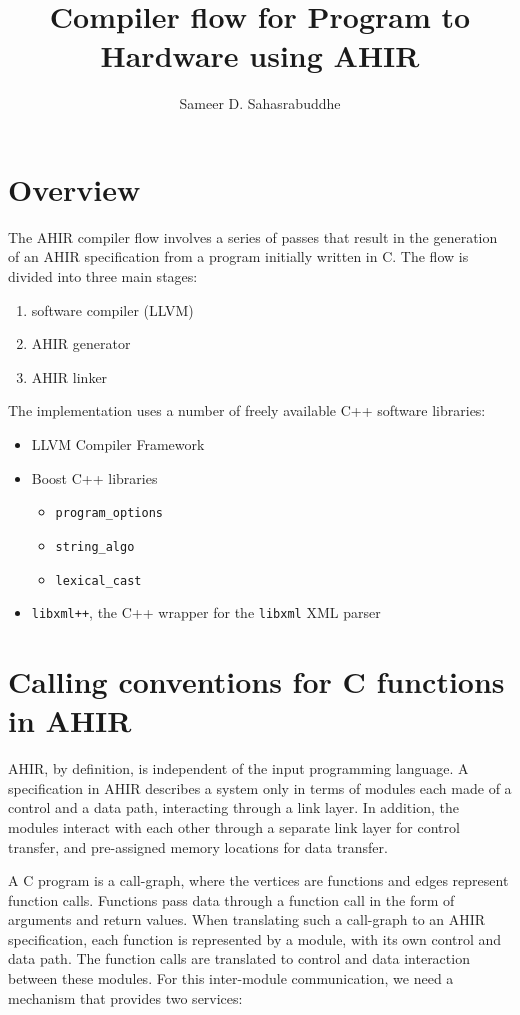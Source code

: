 \documentclass[12pt]{article}
\title{Compiler flow for Program to Hardware using AHIR}
\author{Sameer D. Sahasrabuddhe}
\begin{document}
\maketitle

\section{Overview}

The AHIR compiler flow involves a series of passes that result in the
generation of an AHIR specification from a program initially written
in C. The flow is divided into three main stages:

\begin{enumerate}
\item software compiler (LLVM)
\item AHIR generator
\item AHIR linker
\end{enumerate}

The implementation uses a number of freely available C++ software
libraries:

\begin{itemize}
\item LLVM Compiler Framework
\item Boost C++ libraries
\begin{itemize}
\item {\tt program\_options}
\item {\tt string\_algo}
\item {\tt lexical\_cast}
\end{itemize}
\item {\tt libxml++}, the C++ wrapper for the {\tt libxml} XML parser
\end{itemize}

\section{Calling conventions for C functions in AHIR}
\label{sect:calling-conventions}

AHIR, by definition, is independent of the input programming language. 
A specification in AHIR describes a system only in terms of modules
each made of a control and a data path, interacting through a link
layer. In addition, the modules interact with each other through a
separate link layer for control transfer, and pre-assigned memory
locations for data transfer.

A C program is a call-graph, where the vertices are functions and edges
represent function calls. Functions pass data through a function call
in the form of arguments and return values. When translating such a
call-graph to an AHIR specification, each function is represented by a
module, with its own control and data path. The function calls are
translated to control and data interaction between these modules. For
this inter-module communication, we need a mechanism that provides two
services:
\end{document}
